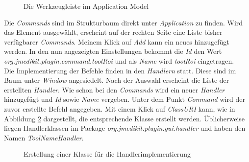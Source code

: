 \begin{figure}[H]
  \vspace{0.5cm}
  \centering
   \caption{Die Werkzeugleiste im Application Model}
  \label{toolmenu}
  \vspace{0.5cm}
\end{figure}

Die \textit{Commands} sind im Strukturbaum direkt unter \textit{Application} zu finden. Wird das Element ausgewählt, erscheint auf der rechten Seite eine Liste bisher verfügbarer \textit{Commands}. Meinem Klick auf \textit{Add} kann ein neues hinzugefügt werden. In den nun angezeigten Einstellungen bekommt die \textit{Id} den Wert \textit{org.jmedikit.plugin.command.toolRoi} und als \textit{Name} wird \textit{toolRoi} eingetragen.\\
Die Implementierung der Befehle finden in den \textit{Handlern} statt. Diese sind im Baum unter \textit{Window} angesiedelt. Nach der Auswahl erscheint die Liste der erstellten \textit{Handler}. Wie schon bei den \textit{Commands} wird ein neuer \textit{Handler} hinzugefügt und \textit{Id} sowie \textit{Name} vergeben. Unter dem Punkt \textit{Command} wird der zuvor erstellte Befehl angegeben. Mit einem Klick auf \textit{ClassURI} kann, wie in Abbildung \ref{tool_handlerclass} dargestellt, die entsprechende Klasse erstellt werden. Üblicherweise liegen Handlerklassen im Package \textit{org.jmedikit.plugin.gui.handler} und haben den Namen \textit{ToolNameHandler}.

\begin{figure}[H]
  \vspace{0.5cm}
  \centering
   \caption{Erstellung einer Klasse für die Handlerimplementierung}
  \label{tool_handlerclass}
  \vspace{0.5cm}
\end{figure}

